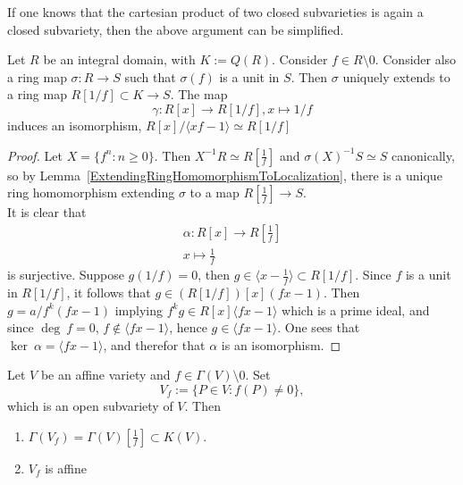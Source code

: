     \begin{remark}
        If one knows that the cartesian product of two closed subvarieties is again a closed subvariety, then the above argument can be simplified.  
    \end{remark}
    \begin{lemma}\label{ImportantIsomorphismForOpenAffineVarieties}
        Let $R$ be an integral domain, with $K:=Q(R)$. Consider $f\in R\setminus 0$. Consider also a ring map $\sigma : R\rightarrow S$ such that $\sigma(f)$ is a unit in $S$. Then $\sigma$ uniquely extends to a ring map $R[1/f]\subset K \rightarrow S$. The map 
        $$\gamma : R[x] \rightarrow R[1/f], x\mapsto 1/f$$
        induces an isomorphism, $R[x]/\langle xf-1\rangle\simeq R[1/f]$
    \end{lemma}
    \begin{proof}
        Let $X=\{ f^n : n\geq 0\}$. Then $X^{-1}R\simeq R\left[\frac{1}{f}\right]$ and $\sigma(X)^{-1}S\simeq S$ canonically, so by Lemma~\ref{ExtendingRingHomomorphismToLocalization}, there is a unique ring homomorphism extending $\sigma$ to a map $R\left[\frac{1}{f}\right] \rightarrow S$.\\
        It is clear that 
        \begin{gather*}
            \alpha: R[x] \rightarrow R\left[\frac{1}{f}\right]\\
            x\mapsto \frac{1}{f}
        \end{gather*}
        is surjective. Suppose $g(1/f)=0$, then $g\in \langle x-\frac{1}{f}\rangle\subset R[1/f]$. Since $f$ is a unit in $R[1/f]$, it follows that $g\in (R[1/f])[x](fx-1)$. Then $g=a/f^k(fx-1)$ implying $f^kg\in R[x]\langle fx-1\rangle$ which is a prime ideal, and since $\deg \ f =0$, $f\notin \langle fx-1\rangle$, hence $g\in \langle fx-1\rangle$. One sees that $\ker \ \alpha = \langle fx-1\rangle$, and therefor that $\alpha$ is an isomorphism.
    \end{proof}
    \begin{proposition}
        Let $V$ be an affine variety and $f\in \Gamma(V)\setminus 0$. Set 
        $$V_f:= \{P\in V: f(P)\neq 0\},$$
        which is an open subvariety of $V$. Then 
        \begin{enumerate}
            \item $\Gamma(V_f)=\Gamma(V)\left[\frac{1}{f}\right] \subset K(V)$.
            \item $V_f$ is affine
        \end{enumerate}
    \end{proposition}
